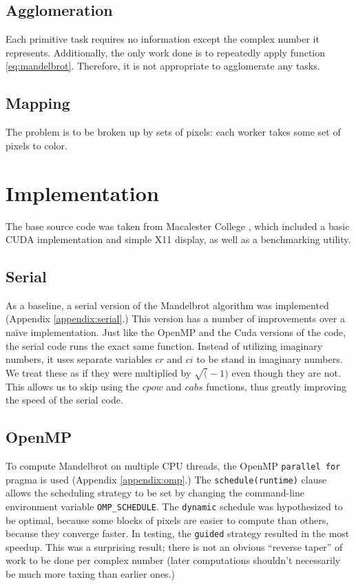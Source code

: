\documentclass{article}
\begin{document}
    \subsection{Agglomeration}
        Each primitive task requires no information except the complex number it represents. Additionally, the only work done is to repeatedly apply function \ref{eq:mandelbrot}. Therefore, it is not appropriate to agglomerate any tasks.

    \subsection{Mapping}
        The problem is to be broken up by sets of pixels: each worker takes some set of pixels to color.


\section{Implementation} \label{sec:impl}
    The base source code was taken from Macalester College \cite{mandel_orig}, which included a basic CUDA implementation and simple X11 display, as well as a benchmarking utility.

    \subsection{Serial}
        As a baseline, a serial version of the Mandelbrot algorithm was implemented (Appendix \ref{appendix:serial}.) This version has a number of improvements over a na\"ive implementation. Just like the OpenMP and the Cuda versions of the code, the serial code runs the exact same function. Instead of utilizing imaginary numbers, it uses separate variables $cr$ and $ci$ to be stand in imaginary numbers. We treat these as if they were multiplied by $\sqrt(-1)$ even though they are not. This allows us to skip using the $cpow$ and $cabs$ functions, thus greatly improving the speed of the serial code.

    \subsection{OpenMP}
        To compute Mandelbrot on multiple CPU threads, the OpenMP \verb|parallel for| pragma is used (Appendix \ref{appendix:omp}.) The \verb|schedule(runtime)| clause allows the scheduling strategy to be set by changing the command-line environment variable \verb|OMP_SCHEDULE|. The \verb|dynamic| schedule was hypothesized to be optimal, because some blocks of pixels are easier to compute than others, because they converge faster. In testing, the \verb|guided| strategy resulted in the most speedup. This was a surprising result; there is not an obvious ``reverse taper'' of work to be done per complex number (later computations shouldn't necessarily be much more taxing than earlier ones.)
\end{document}
